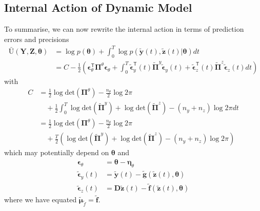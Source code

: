 \documentclass[a4paper,10pt]{article}
\newcommand{\bs}[1]{\mathbf{#1}}					%
\newcommand{\bgs}[1]{\boldsymbol{#1}}				%
\newcommand{\tr}{\mathsf{T}}				%
\newcommand{\gc}[1]{\tilde{#1}} %
\renewcommand{\ss}{z}         %
\newcommand{\so}{y}         %
\newcommand{\spe}{\epsilon} %
\renewcommand{\sp}{\theta}    %
\newcommand{\ps}{\bs{\ss}}    %
\newcommand{\po}{\bs{\so}}    %
\newcommand{\ppe}{\bgs{\spe}} %
\newcommand{\psg}{\gc{\ps}}    %
\newcommand{\pog}{\gc{\po}}    %
\newcommand{\ppeg}{\gc{\ppe}} %
\newcommand{\pp}{\bgs{\sp}} %
\newcommand{\Ps}{\bs{Z}}    %
\newcommand{\Po}{\bs{Y}}    %
\newcommand{\D}{\bs{D}}				%
\newcommand{\Ua}{\bar{\mathrm{U}}}		%
\newcommand{\Prec}{\bgs{\Pi}}			%
\renewcommand{\det}[1]{\mathrm{det}(#1)}	%
\begin{document}
\subsection{Internal Action of Dynamic Model}
To summarise, we can now rewrite the internal action in terms of prediction errors and precisions
\begin{align}
    \Ua(\Po,\Ps,\pp) &= \log p(\pp) + \int_0^T \log p(\pog(t),\psg(t)|\pp)dt\nonumber\\
    &= C - \frac{1}{2}\left(\ppe_\sp^\tr\Prec^{\sp}\ppe_\sp + \int_0^T \ppeg_\so^\tr(t)\gc{\Prec}^{\so}\ppeg_\so(t) + \ppeg_\ss^\tr(t)\gc{\Prec}^{\ss}\ppeg_\ss(t)  dt\right)
\end{align}
with 
\begin{align}
    C &= \frac{1}{2}\log\det{\Prec^{\sp}} - \frac{n_\sp}{2}\log 2\pi\nonumber\\
    &\quad + \frac{1}{2} \int_0^T \log\det{\gc{\Prec}^{\so}} + \log\det{\gc{\Prec}^{\ss}} - (n_\so + n_\ss)\log 2\pi dt\\
    &= \frac{1}{2}\log\det{\Prec^{\sp}} - \frac{n_\sp}{2}\log 2\pi\nonumber\\
    &\quad + \frac{T}{2} \left( \log\det{\gc{\Prec}^{\so}} + \log\det{\gc{\Prec}^{\ss}} - (n_\so + n_\ss)\log 2\pi \right)
\end{align}
which may potentially depend on $\pp$ and
\begin{align}
    \ppe_\sp &= \pp - \bgs{\eta}_\sp\\
    \ppeg_\so(t) &= \pog(t) - \gc{\bs{g}}(\psg(t),\pp)\\
    \ppeg_\ss(t) &= \D\psg(t) - \gc{\bs{f}}(\psg(t),\pp)
\end{align}
where we have equated $\gc{\bgs{\mu}}_{\gc{f}}=\gc{\bs{f}}$.
\end{document}

